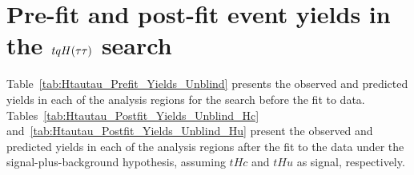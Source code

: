 \section{Pre-fit and post-fit event yields in the $tqH(\tau\tau)$ search}
\label{sec:prepostfit_yields_Htautau_appendix}

Table~\ref{tab:Htautau_Prefit_Yields_Unblind} presents the observed and predicted yields in each of the analysis regions 
for the search before the fit to data. 
Tables~\ref{tab:Htautau_Postfit_Yields_Unblind_Hc} and~\ref{tab:Htautau_Postfit_Yields_Unblind_Hu} present the observed and predicted yields 
in each of the analysis regions after the fit to the data under the signal-plus-background hypothesis, assuming 
$tHc$ and $tHu$ as signal, respectively.

